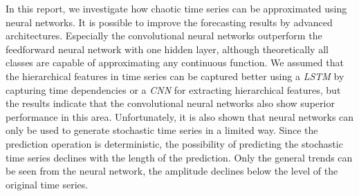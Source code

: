 \documentclass{article}
\begin{document}
In this report, we investigate how chaotic time series can be approximated
using neural networks. It is possible to improve the forecasting results by
advanced architectures. Especially the convolutional neural networks
outperform the feedforward neural network with one hidden layer,
although theoretically all classes are capable of approximating any continuous
function. We assumed that the hierarchical features in time series can be
captured better using a \emph{LSTM} by capturing time dependencies or a
\emph{CNN} for extracting hierarchical features, but the results indicate that
the convolutional neural networks also show superior performance in this area.
Unfortunately, it is also shown that neural networks can only be used to
generate stochastic time series in a limited way. Since the prediction operation
is deterministic, the possibility of predicting the stochastic time series
declines with the length of the prediction. Only the general trends can be seen
from the neural network, the amplitude declines below the level of the
original time series.



\end{document}
